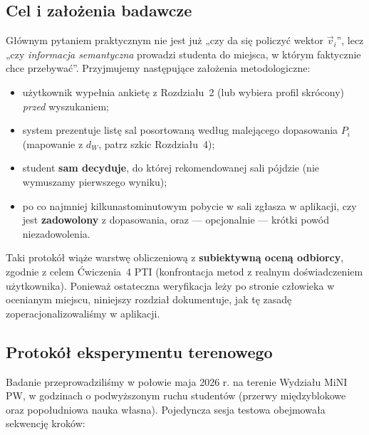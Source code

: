 \documentclass[14pt,a4paper]{extarticle}
\begin{document}
\subsection{Cel i założenia badawcze}
Głównym pytaniem praktycznym nie jest już „czy da się policzyć wektor $\vec{v}_i$”, lecz „czy \emph{informacja semantyczna} prowadzi studenta do miejsca, w którym faktycznie chce przebywać”. Przyjmujemy następujące założenia metodologiczne:
\begin{itemize}
    \item użytkownik wypełnia ankietę z Rozdziału~2 (lub wybiera profil skrócony) \emph{przed} wyszukaniem;
    \item system prezentuje listę sal posortowaną według malejącego dopasowania $P_i$ (mapowanie z $d_W$, patrz szkic Rozdziału~4);
    \item student \textbf{sam decyduje}, do której rekomendowanej sali pójdzie (nie wymuszamy pierwszego wyniku);
    \item po co najmniej kilkunastominutowym pobycie w sali zgłasza w aplikacji, czy jest \textbf{zadowolony} z dopasowania, oraz --- opcjonalnie --- krótki powód niezadowolenia.
\end{itemize}
Taki protokół wiąże warstwę obliczeniową z \textbf{subiektywną oceną odbiorcy}, zgodnie z celem Ćwiczenia~4 PTI (konfrontacja metod z realnym doświadczeniem użytkownika). Ponieważ ostateczna weryfikacja leży po stronie człowieka w ocenianym miejscu, niniejszy rozdział dokumentuje, jak tę zasadę zoperacjonalizowaliśmy w aplikacji.

\subsection{Protokół eksperymentu terenowego}
Badanie przeprowadziliśmy w połowie maja 2026 r. na terenie Wydziału MiNI PW, w godzinach o podwyższonym ruchu studentów (przerwy międzyblokowe oraz popołudniowa nauka własna). Pojedyncza sesja testowa obejmowała sekwencję kroków:
\end{document}

